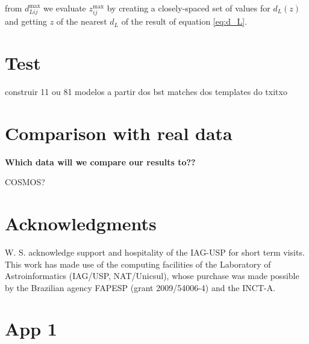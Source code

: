 \documentclass[a4paper, useAMS, usenatbib, hyperpdf]{mn2e}
\begin{document}
\noindent from $d^{\textrm{max}}_{L ij}$ we evaluate $z^{\textrm{max}}_{ij}$ by creating a closely-spaced set of values for $d_L(z)$ and getting $z$ of the nearest $d_L$ of the result of equation \ref{eq:d_L}.

\section{Test}
construir 11 ou 81 modelos a partir dos bst matches dos templates do txitxo

\section{Comparison with real data}
\label{sec:application}
{\bf \color{red} Which data will we compare our results to??}

COSMOS?


\section*{Acknowledgments}
W. S. acknowledge support and hospitality of the IAG-USP for short term visits. This work has made use of the computing facilities of the Laboratory of Astroinformatics (IAG/USP, NAT/Unicsul), whose purchase was made possible by the Brazilian agency FAPESP (grant 2009/54006-4) and the INCT-A.




\appendix

\section{App 1}
\label{app:bias}

 
\end{document}

